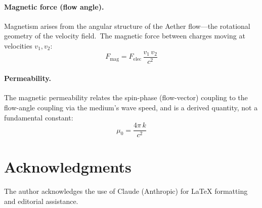 ﻿\documentclass[12pt,letterpaper]{article}
\begin{document}
\paragraph{Magnetic force (flow angle).}
Magnetism arises from the angular structure of the Aether flow---the rotational
geometry of the velocity field.\ The magnetic force between charges moving at
velocities $v_1, v_2$:
%
\begin{equation}
  F_{\mathrm{mag}} = F_{\mathrm{elec}}\,\frac{v_1\,v_2}{c^2}
  \label{eq:sum-mag-force}
\end{equation}

\paragraph{Permeability.}
The magnetic permeability relates the spin-phase (flow-vector) coupling
to the flow-angle coupling via the medium's wave speed, and is a derived quantity, not
a fundamental constant:
%
\begin{equation}
  \mu_0 = \frac{4\pi\,k}{c^2}
  \label{eq:sum-mu0}
\end{equation}



\section*{Acknowledgments}

The author acknowledges the use of Claude (Anthropic) for \LaTeX{} formatting
and editorial assistance.

\bigskip


\end{document}
